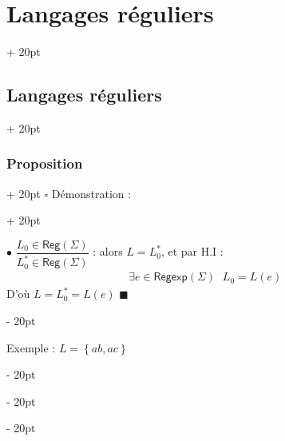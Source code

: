 \documentclass[a4paper, 12pt, twoside]{article}
\newcommand{\set}[1]{\left\{ #1 \right\}}
\newcommand{\ind}[1][20pt]{\advance\leftskip + #1}
\newcommand{\deind}[1][20pt]{\advance\leftskip - #1}
\newenvironment{indt}[2][20pt]{#2 \par \ind[#1]}{\par \deind} %
\newenvironment{proof}[1][{Démonstration :}]{\begin{indt}{$\square$ #1}}{$\blacksquare$ \end{indt}}
\newcommand{\Reg}{\mathsf{Reg}}
\newcommand{\Regexp}{\mathsf{Regexp}}
\begin{document}
\begin{indt}{\section{Langages réguliers}}
\begin{indt}{\subsection{Langages réguliers}}
\begin{indt}{\subsubsection{Proposition}}
\begin{proof}
                    \vspace{6pt}
                    
                    $\bullet$ $\dfrac{L_0 \in \Reg(\Sigma)}{L_0^* \in \Reg(\Sigma)}$ : alors $L = L_0^*$, et par H.I :
                    \[
                        \exists e \in \Regexp(\Sigma)\
                        \begin{array}{|l}
                            L_0 = L(e)
                        \end{array}
                    \]
                    D'où $L = L_0^* = L(e)$
                \end{proof}

                \vspace{12pt}
                
                Exemple : $L = \set{ab, ac}$


\end{indt}
\end{indt}
\end{indt}
\end{document}
